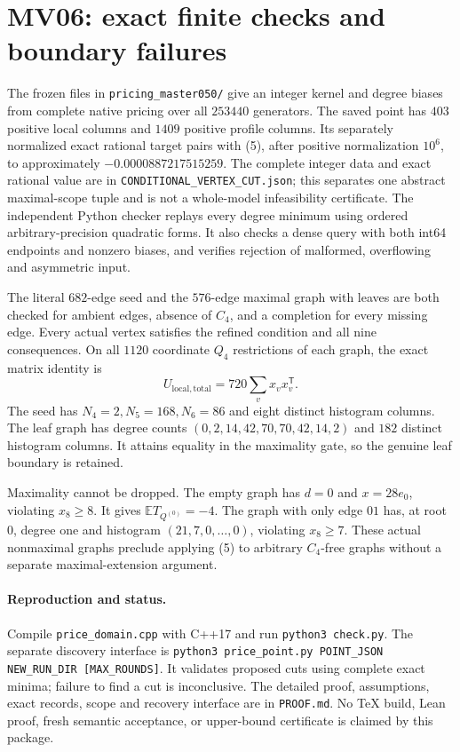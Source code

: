 \documentclass[11pt]{article}
\begin{document}
\section{MV06: exact finite checks and boundary failures}
The frozen files in \texttt{pricing\_master050/} give an integer
kernel and degree biases from complete native pricing over all
$253440$ generators. The saved point has $403$ positive local columns
and $1409$ positive profile columns. Its separately normalized exact
rational target pairs with (5), after positive normalization $10^6$,
to approximately $-0.0000887217515259$.
The complete integer data and exact rational value are in
\texttt{CONDITIONAL\_VERTEX\_CUT.json}; this separates one abstract
maximal-scope tuple and is not a whole-model infeasibility certificate.
The independent Python checker replays every degree minimum using
ordered arbitrary-precision quadratic forms. It also checks a dense
query with both int64 endpoints and nonzero biases, and verifies
rejection of malformed, overflowing and asymmetric input.

The literal $682$-edge seed and the $576$-edge maximal graph with leaves
are both checked for ambient edges, absence of $C_4$, and a completion
for every missing edge. Every actual vertex satisfies the refined
condition and all nine consequences. On all $1120$ coordinate $Q_4$
restrictions of each graph, the exact matrix identity is
\[
 U_{\mathrm{local,total}}=720\sum_v x_vx_v^{\mathsf T}.
\]
The seed has $N_4=2,N_5=168,N_6=86$ and eight distinct histogram columns.
The leaf graph has degree counts $(0,2,14,42,70,70,42,14,2)$ and $182$
distinct histogram columns. It attains equality in the maximality gate,
so the genuine leaf boundary is retained.

Maximality cannot be dropped. The empty graph has $d=0$ and $x=28e_0$,
violating $x_8\ge8$. It gives $\mathbb E T_{Q^{(0)}}=-4$.
The graph with only edge $01$ has, at root $0$, degree one and
histogram $(21,7,0,\ldots,0)$, violating $x_8\ge7$.
These actual nonmaximal graphs preclude applying (5) to arbitrary
$C_4$-free graphs without a separate maximal-extension argument.

\paragraph{Reproduction and status.}
Compile \texttt{price\_domain.cpp} with C++17 and run
\texttt{python3 check.py}. The separate discovery interface is
\texttt{python3 price\_point.py POINT\_JSON NEW\_RUN\_DIR [MAX\_ROUNDS]}.
It validates proposed cuts using complete exact minima; failure to
find a cut is inconclusive. The detailed proof, assumptions, exact
records, scope and recovery interface are in \texttt{PROOF.md}.
No TeX build, Lean proof, fresh semantic acceptance, or upper-bound
certificate is claimed by this package.
\end{document}
